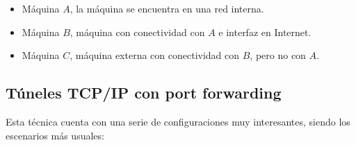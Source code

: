 \documentclass[a4paper, 11pt, titlepage]{article}
\begin{document}
        \begin{itemize}
            \item Máquina $A$, la máquina se encuentra en una red interna.
            \item Máquina $B$, máquina con conectividad con $A$ e interfaz en Internet.
            \item Máquina $C$, máquina externa con conectividad con $B$, pero no con $A$.
        \end{itemize}

    \subsection{Túneles TCP/IP con port forwarding}\label{sshforwarding}

        Esta técnica cuenta con una serie de configuraciones muy interesantes, siendo los escenarios más usuales:
\end{document}
